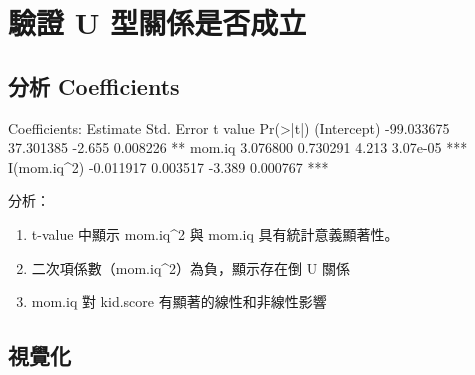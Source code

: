 \documentclass[
]{article}
\newenvironment{Shaded}{\begin{snugshade}}{\end{snugshade}}
\newcommand{\AttributeTok}[1]{\textcolor[rgb]{0.13,0.29,0.53}{#1}}
\newcommand{\CommentTok}[1]{\textcolor[rgb]{0.56,0.35,0.01}{\textit{#1}}}
\newcommand{\ConstantTok}[1]{\textcolor[rgb]{0.56,0.35,0.01}{#1}}
\newcommand{\FunctionTok}[1]{\textcolor[rgb]{0.13,0.29,0.53}{\textbf{#1}}}
\newcommand{\NormalTok}[1]{#1}
\newcommand{\SpecialCharTok}[1]{\textcolor[rgb]{0.81,0.36,0.00}{\textbf{#1}}}
\newcommand{\StringTok}[1]{\textcolor[rgb]{0.31,0.60,0.02}{#1}}
\providecommand{\tightlist}{%
  \setlength{\itemsep}{0pt}\setlength{\parskip}{0pt}}
\begin{document}
\section{驗證 U
型關係是否成立}\label{ux9a57ux8b49-u-ux578bux95dcux4fc2ux662fux5426ux6210ux7acb}

\subsection{分析 Coefficients}\label{ux5206ux6790-coefficients}

\begin{Shaded}
\begin{Highlighting}[]
\NormalTok{Coefficients:}
\NormalTok{              Estimate Std. Error t value Pr(\textgreater{}|t|)    }
\NormalTok{(Intercept) {-}99.033675  37.301385  {-}2.655 0.008226 ** }
\NormalTok{mom.iq        3.076800   0.730291   4.213 3.07e{-}05 ***}
\NormalTok{I(mom.iq\^{}2)  {-}0.011917   0.003517  {-}3.389 0.000767 ***}
\end{Highlighting}
\end{Shaded}

分析：

\begin{enumerate}
\def\labelenumi{\arabic{enumi}.}
\tightlist
\item
  t-value 中顯示 mom.iq\^{}2 與 mom.iq 具有統計意義顯著性。
\item
  二次項係數（mom.iq\^{}2）為負，顯示存在倒 U 關係
\item
  mom.iq 對 kid.score 有顯著的線性和非線性影響
\end{enumerate}

\subsection{視覺化}\label{ux8996ux89baux5316}

\begin{Shaded}
\end{Shaded}
\end{document}
